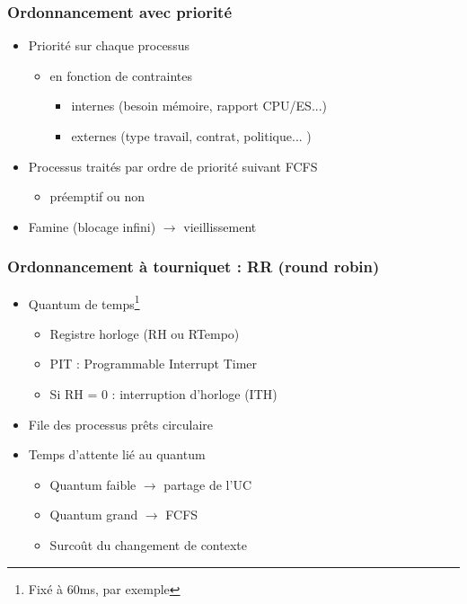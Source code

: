 \begin{frame}
 \frametitle{Ordonnancement avec priorité}
 \begin{itemize}
 \item Priorité sur chaque processus
 \begin{itemize}
 \item en fonction de contraintes
 \begin{itemize}
 \item internes (besoin mémoire, rapport CPU/ES...)
 \item externes (type travail, contrat, politique... )
 \end{itemize} \end{itemize}

 
 \item Processus traités par ordre de priorité suivant FCFS
 \begin{itemize} \item préemptif ou non  \end{itemize}
 \item Famine (blocage infini) $\rightarrow$ vieillissement
 \end{itemize}
\end{frame}



\begin{frame}
 \frametitle{Ordonnancement à tourniquet : RR (round robin)}
 \begin{itemize}
 \item Quantum de temps\footnote{Fixé à 60ms, par exemple}
 \begin{itemize}
\item Registre horloge (RH ou RTempo)
\item PIT : Programmable Interrupt Timer
\item Si RH = 0 : interruption d'horloge (ITH)
\end{itemize}

 \item File des processus prêts circulaire
 \item Temps d’attente lié au quantum
 \begin{itemize}
 \item Quantum faible $\rightarrow$ partage de l’UC
 \item Quantum grand $\rightarrow$ FCFS
 \item Surcoût du changement de contexte
 \end{itemize}
 \end{itemize}
\end{frame}


